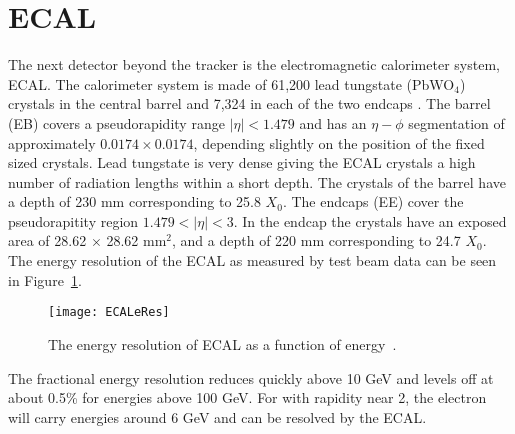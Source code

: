  \section{ECAL}
    The next detector beyond the tracker is the electromagnetic calorimeter 
      system, ECAL.
    The calorimeter system is made of 61,200 lead tungstate (PbWO$_{4}$) 
      crystals in the central barrel and 7,324 in each of the two endcaps 
      \cite{tCmsE}.
    The barrel (EB) covers a pseudorapidity range $|\eta| < 1.479$ and has an
    	$\eta-\phi$ segmentation of approximately $0.0174\times0.0174$, depending
      slightly on the position of the fixed sized crystals.
    Lead tungstate is very dense giving the ECAL crystals a high number of 
      radiation lengths within a short depth.
    The crystals of the barrel have a depth of 230 mm corresponding to 25.8 
    	$X_{0}$.
    The endcaps (EE) cover the pseudorapitity region $1.479 < |\eta| < 3$.
    In the endcap the crystals have an exposed area of 28.62 $\times$ 28.62 
    	mm$^{2}$, and a depth of 220 mm corresponding to 24.7 $X_{0}$.
    The energy resolution of the ECAL as measured by test beam data can be seen in
    	Figure~\ref{ECALeRes}.
    \begin{figure}[!Hhbt]
      \centering
        \texttt{[image: ECALeRes]}
      \caption{The energy resolution of ECAL as a function of energy~\cite{tCmsE}.}
      \label{ECALeRes}
    \end{figure}
    The fractional energy resolution reduces quickly above 10 GeV and levels
      off at about 0.5\% for energies above 100 GeV. 
    For \JPsi{} with rapidity near 2, the electron will carry energies around
      6 GeV and can be resolved by the ECAL. 

